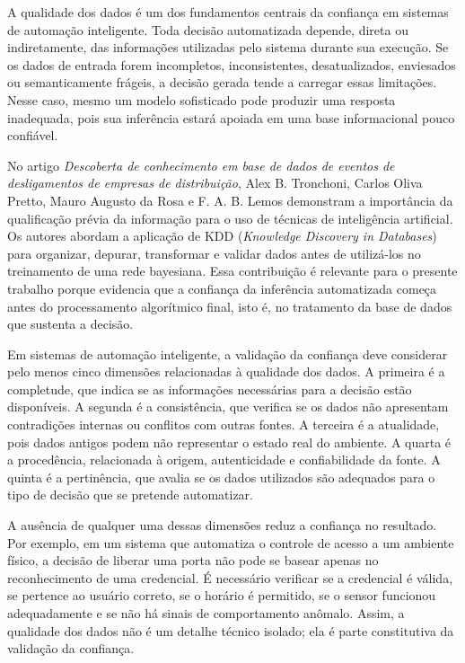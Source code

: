 \documentclass[12pt]{article}
\begin{document}
A qualidade dos dados é um dos fundamentos centrais da confiança em sistemas de automação inteligente. Toda decisão automatizada depende, direta ou indiretamente, das informações utilizadas pelo sistema durante sua execução. Se os dados de entrada forem incompletos, inconsistentes, desatualizados, enviesados ou semanticamente frágeis, a decisão gerada tende a carregar essas limitações. Nesse caso, mesmo um modelo sofisticado pode produzir uma resposta inadequada, pois sua inferência estará apoiada em uma base informacional pouco confiável.

No artigo \textit{Descoberta de conhecimento em base de dados de eventos de desligamentos de empresas de distribuição}, Alex B. Tronchoni, Carlos Oliva Pretto, Mauro Augusto da Rosa e F. A. B. Lemos \cite{tronchoni2010} demonstram a importância da qualificação prévia da informação para o uso de técnicas de inteligência artificial. Os autores abordam a aplicação de KDD (\textit{Knowledge Discovery in Databases}) para organizar, depurar, transformar e validar dados antes de utilizá-los no treinamento de uma rede bayesiana. Essa contribuição é relevante para o presente trabalho porque evidencia que a confiança da inferência automatizada começa antes do processamento algorítmico final, isto é, no tratamento da base de dados que sustenta a decisão.

Em sistemas de automação inteligente, a validação da confiança deve considerar pelo menos cinco dimensões relacionadas à qualidade dos dados. A primeira é a completude, que indica se as informações necessárias para a decisão estão disponíveis. A segunda é a consistência, que verifica se os dados não apresentam contradições internas ou conflitos com outras fontes. A terceira é a atualidade, pois dados antigos podem não representar o estado real do ambiente. A quarta é a procedência, relacionada à origem, autenticidade e confiabilidade da fonte. A quinta é a pertinência, que avalia se os dados utilizados são adequados para o tipo de decisão que se pretende automatizar.

A ausência de qualquer uma dessas dimensões reduz a confiança no resultado. Por exemplo, em um sistema que automatiza o controle de acesso a um ambiente físico, a decisão de liberar uma porta não pode se basear apenas no reconhecimento de uma credencial. É necessário verificar se a credencial é válida, se pertence ao usuário correto, se o horário é permitido, se o sensor funcionou adequadamente e se não há sinais de comportamento anômalo. Assim, a qualidade dos dados não é um detalhe técnico isolado; ela é parte constitutiva da validação da confiança.
\end{document}
